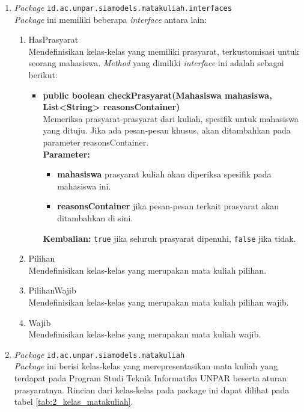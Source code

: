 \begin{enumerate}
	\item \textit{Package} \texttt{id.ac.unpar.siamodels.matakuliah.interfaces}\\
	\textit{Package} ini memiliki beberapa \textit{interface} antara lain:
	\begin{enumerate}
		\item HasPrasyarat\\
		Mendefinisikan kelas-kelas yang memiliki prasyarat, terkustomisasi untuk seorang mahasiswa. \textit{Method} yang dimiliki \textit{interface} ini adalah sebagai berikut: 
		\begin{itemize}
			\item \textbf{public boolean checkPrasyarat(Mahasiswa mahasiswa, List<String> reasonsContainer)} \\
			Memeriksa prasyarat-prasyarat dari kuliah, spesifik untuk mahasiswa yang dituju. Jika ada pesan-pesan khusus, akan ditambahkan pada parameter reasonsContainer.\\
			\textbf{Parameter:}
			\begin{itemize}
				\item \textbf{mahasiswa} prasyarat kuliah akan diperiksa spesifik pada mahasiswa ini.
				\item \textbf{reasonsContainer} jika pesan-pesan terkait prasyarat akan ditambahkan di sini.
			\end{itemize}
			\textbf{Kembalian:} \texttt{true} jika seluruh prasyarat dipenuhi, \texttt{false} jika tidak.
		\end{itemize}
		
		\item Pilihan\\
		Mendefinisikan kelas-kelas yang merupakan mata kuliah pilihan.
		\item PilihanWajib\\
		Mendefinisikan kelas-kelas yang merupakan mata kuliah pilihan wajib.
		\item Wajib\\
		Mendefinisikan kelas-kelas yang merupakan mata kuliah wajib.
	\end{enumerate}
	
	\item \textit{Package} \texttt{id.ac.unpar.siamodels.matakuliah}\\
	\textit{Package} ini berisi kelas-kelas yang merepresentasikan mata kuliah yang terdapat pada Program Studi Teknik Informatika UNPAR beserta aturan prasyaratnya. Rincian dari kelas-kelas pada package ini dapat dilihat pada tabel \ref{tab:2_kelas_matakuliah}.


\end{enumerate}

